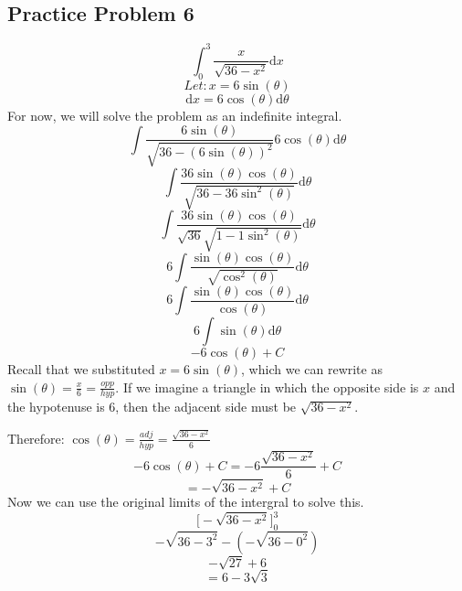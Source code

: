 \documentclass[letterpaper, 12pt]{article}
\newcommand*{\diff}{\mathrm{d}}
\begin{document}
\subsection*{Practice Problem 6}
\[ \int_{0}^{3}{\frac{x}{\sqrt{36-x^{2}}}\diff{x}} \]
\[ Let: x = 6\sin(\theta) \]
\[ \diff{x} = 6\cos(\theta)\diff{\theta} \]
For now, we will solve the problem as an indefinite integral.
\[ \int{\frac{6\sin(\theta)}
   {\sqrt{36-(6\sin(\theta))^{2}}}6\cos(\theta)\diff{\theta}} \]
\[ \int{\frac{36\sin(\theta)\cos(\theta)}
   {\sqrt{36-36\sin^{2}(\theta)}}\diff{\theta}} \]
\[ \int{\frac{36\sin(\theta)\cos(\theta)}
   {\sqrt{36}\sqrt{1-1\sin^{2}(\theta)}}\diff{\theta}} \]
\[ 6\int{\frac{\sin(\theta)\cos(\theta)}
   {\sqrt{\cos^{2}(\theta)}}\diff{\theta}} \]
\[ 6\int{\frac{\sin(\theta)\cos(\theta)}
   {\cos(\theta)}\diff{\theta}} \]
\[ 6\int{\sin(\theta)\diff{\theta}} \]
\[ -6\cos(\theta)+C \]
Recall that we substituted \( x = 6\sin(\theta) \), which we can rewrite as
\( \sin(\theta) = \frac{x}{6} = \frac{opp}{hyp} \). If we imagine a triangle in
which the opposite side is \( x \) and the hypotenuse is 6, then the adjacent
side must be \( \sqrt{36-x^{2}} \).
\begin{center}
\end{center}
Therefore: \( \cos(\theta) = \frac{adj}{hyp} = \frac{\sqrt{36-x^{2}}}{6} \)
\[ -6\cos(\theta)+C = -6\frac{\sqrt{36-x^{2}}}{6}+C \]
\[ = -\sqrt{36-x^{2}}+C \]
Now we can use the original limits of the intergral to solve this.
\[ \bigg[-\sqrt{36-x^{2}}\bigg]_{0}^{3} \]
\[ -\sqrt{36-3^{2}}-(-\sqrt{36-0^{2}}) \]
\[ -\sqrt{27}+6 \]
\[ = 6-3\sqrt{3} \]
\end{document}
